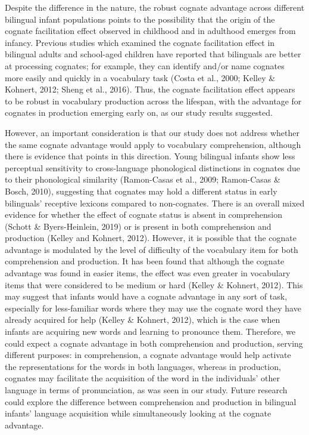 \documentclass[
  english,
  ,man,floatsintext]{apa6}
\begin{document}
Despite the difference in the nature, the robust cognate advantage across different bilingual infant populations points to the possibility that the origin of the cognate facilitation effect observed in childhood and in adulthood emerges from infancy. Previous studies which examined the cognate facilitation effect in bilingual adults and school-aged children have reported that bilinguals are better at processing cognates; for example, they can identify and/or name cognates more easily and quickly in a vocabulary task (Costa et al., 2000; Kelley \& Kohnert, 2012; Sheng et al., 2016). Thus, the cognate facilitation effect appears to be robust in vocabulary production across the lifespan, with the advantage for cognates in production emerging early on, as our study results suggested.

However, an important consideration is that our study does not address whether the same cognate advantage would apply to vocabulary comprehension, although there is evidence that points in this direction. Young bilingual infants show less perceptual sensitivity to cross-language phonological distinctions in cognates due to their phonological similarity (Ramon-Casas et al., 2009; Ramon-Casas \& Bosch, 2010), suggesting that cognates may hold a different status in early bilinguals' receptive lexicons compared to non-cognates. There is an overall mixed evidence for whether the effect of cognate status is absent in comprehension (Schott \& Byers-Heinlein, 2019) or is present in both comprehension and production (Kelley and Kohnert, 2012). However, it is possible that the cognate advantage is modulated by the level of difficulty of the vocabulary item for both comprehension and production. It has been found that although the cognate advantage was found in easier items, the effect was even greater in vocabulary items that were considered to be medium or hard (Kelley \& Kohnert, 2012). This may suggest that infants would have a cognate advantage in any sort of task, especially for less-familiar words where they may use the cognate word they have already acquired for help (Kelley \& Kohnert, 2012), which is the case when infants are acquiring new words and learning to pronounce them. Therefore, we could expect a cognate advantage in both comprehension and production, serving different purposes: in comprehension, a cognate advantage would help activate the representations for the words in both languages, whereas in production, cognates may facilitate the acquisition of the word in the individuals' other language in terms of pronunciation, as was seen in our study. Future research could explore the difference between comprehension and production in bilingual infants' language acquisition while simultaneously looking at the cognate advantage.
\end{document}
